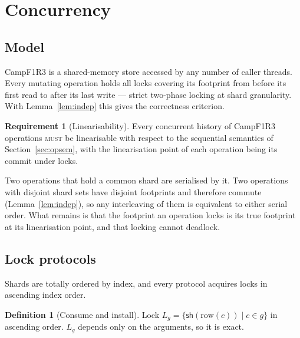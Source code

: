 \documentclass[11pt]{article}
\theoremstyle{plain}
\theoremstyle{definition}
\newtheorem{definition}[proposition]{Definition}
\newtheorem{requirement}{Requirement}
\newcommand{\Camp}{CampF1R3}
\newcommand{\sh}{\mathsf{sh}}
\newcommand{\MUST}{\textsc{must}}
\begin{document}
\section{Concurrency}\label{sec:concurrency}

\subsection{Model}

\Camp{} is a shared-memory store accessed by any number of caller threads. Every
mutating operation holds all locks covering its footprint from before its first read
to after its last write --- strict two-phase locking at shard granularity. With
Lemma~\ref{lem:indep} this gives the correctness criterion.

\begin{requirement}[Linearisability]\label{req:lin}
Every concurrent history of \Camp{} operations \MUST{} be linearisable with respect to
the sequential semantics of Section~\ref{sec:opsem}, with the linearisation point of
each operation being its commit under locks.
\end{requirement}

Two operations that hold a common shard are serialised by it. Two operations with
disjoint shard sets have disjoint footprints and therefore commute
(Lemma~\ref{lem:indep}), so any interleaving of them is equivalent to either serial
order. What remains is that the footprint an operation locks is its true footprint
at its linearisation point, and that locking cannot deadlock.

\subsection{Lock protocols}

Shards are totally ordered by index, and every protocol acquires locks in
ascending index order.

\begin{definition}[Consume and install]
Lock $L_g=\{\sh(\mathrm{row}(c))\mid c\in g\}$ in ascending order. $L_g$ depends
only on the arguments, so it is exact.
\end{definition}
\end{document}
